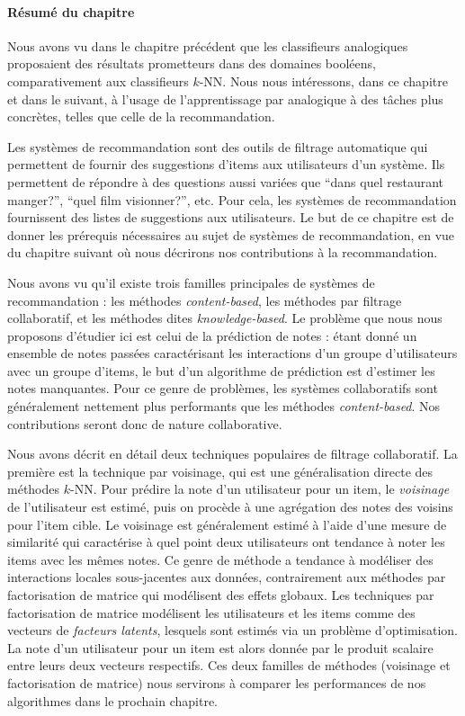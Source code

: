 \paragraph{Résumé du chapitre}

Nous avons vu dans le chapitre précédent que les classifieurs analogiques
proposaient des résultats prometteurs dans des domaines booléens,
comparativement aux classifieurs $k$-NN. Nous nous intéressons, dans ce
chapitre et dans le suivant, à l'usage de l'apprentissage par analogique à des
tâches plus concrètes, telles que celle de la recommandation.

Les systèmes de recommandation sont des outils de filtrage automatique qui
permettent de fournir des suggestions d'items aux utilisateurs d'un système.
Ils permettent de répondre à des questions aussi variées que ``dans quel
restaurant manger?'', ``quel film visionner?'', etc. Pour cela, les systèmes de
recommandation fournissent des listes de suggestions aux utilisateurs.
Le but de ce chapitre est de donner les prérequis nécessaires au sujet de
systèmes de recommandation, en vue du chapitre suivant où nous décrirons nos
contributions à la recommandation.

Nous avons vu qu'il existe trois familles principales de systèmes de
recommandation : les méthodes \textit{content-based}, les méthodes par filtrage
collaboratif, et les méthodes dites \textit{knowledge-based}. Le problème que
nous nous proposons d'étudier ici est celui de la prédiction de notes : étant
donné un ensemble de notes passées caractérisant les interactions d'un groupe
d'utilisateurs avec un groupe d'items, le but d'un algorithme de prédiction est
d'estimer les notes manquantes. Pour ce genre de problèmes, les systèmes
collaboratifs sont généralement nettement plus performants que les méthodes
\textit{content-based}. Nos contributions seront donc de nature collaborative.

Nous avons décrit en détail deux techniques populaires de filtrage
collaboratif. La première est la technique par voisinage, qui est une
généralisation directe des méthodes $k$-NN. Pour prédire la note d'un
utilisateur pour un item, le \textit{voisinage} de l'utilisateur est estimé,
puis on procède à une agrégation des notes des voisins pour l'item cible. Le
voisinage est généralement estimé à l'aide d'une mesure de similarité qui
caractérise à quel point deux utilisateurs ont tendance à noter les items avec
les mêmes notes. Ce genre de méthode a tendance à  modéliser des interactions
locales sous-jacentes aux données, contrairement aux méthodes par factorisation
de matrice qui modélisent des effets globaux. Les techniques par factorisation
de matrice modélisent les utilisateurs et les items comme des vecteurs de
\textit{facteurs latents}, lesquels sont estimés via un problème
d'optimisation. La note d'un utilisateur pour un item est alors donnée par le
produit scalaire entre leurs deux vecteurs respectifs. Ces deux familles de
méthodes (voisinage et factorisation de matrice) nous servirons à comparer les
performances de nos algorithmes dans le prochain chapitre.
